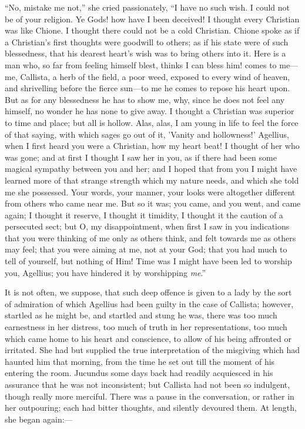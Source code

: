 ``No, mistake me not,'' she cried passionately, ``I
have no such wish. I could not be of your religion. Ye Gods! how have
I been deceived! I thought every Christian was like Chione. I thought
there could not be a cold Christian. Chione spoke as if a Christian's
first thoughts were goodwill to others; as if his state were of such
blessedness, that his dearest heart's wish was to bring others into
it. Here is a man who, so far from feeling himself blest, thinks I can
bless him! comes to me—me, Callista, a herb of the field, a poor
weed, exposed to every wind of heaven, and shrivelling before the
fierce sun—to me he comes to repose his heart upon. But as for any
blessedness he has to show me, why, since he does not feel any
himself, no wonder he has none to give away. I thought a Christian was
superior to time and place; but all is hollow. Alas, alas, I am young
in life to feel the force of that saying, with which sages go out of
it, 'Vanity and hollowness!' Agellius, when I first heard you were a
Christian, how my heart beat! I thought of her who was gone; and at
first I thought I saw her in you, as if there had been some magical
sympathy between you and her; and I hoped that from you I might have
learned more of that strange strength which my nature needs, and which
she told me she possessed. Your words, your manner, your looks were
altogether different from others who came near me. But so it was; you
came, and you went, and came again; I thought it reserve, I thought it
timidity, I thought it the caution of a persecuted sect; but O, my
disappointment, when first I saw in you indications that you
were thinking of me only as others think, and felt towards me as
others may feel; that you were aiming at me, not at your God; that you
had much to tell of yourself, but nothing of Him! Time was I might
have been led to worship you, Agellius; you have hindered it by
worshipping \emph{me}.''

It is not often, we suppose, that such deep offence is given to a
lady by the sort of admiration of which Agellius had been guilty in
the case of Callista; however, startled as he might be, and startled
and stung he was, there was too much earnestness in her distress, too
much of truth in her representations, too much which came home to his
heart and conscience, to allow of his being affronted or irritated.
She had but supplied the true interpretation of the misgiving which
had haunted him that morning, from the time he set out till the moment
of his entering the room. Jucundus some days back had readily
acquiesced in his assurance that he was not inconsistent; but Callista
had not been so indulgent, though really more merciful. There was a
pause in the conversation, or rather in her outpouring; each had
bitter thoughts, and silently devoured them. At length, she began
again:—

